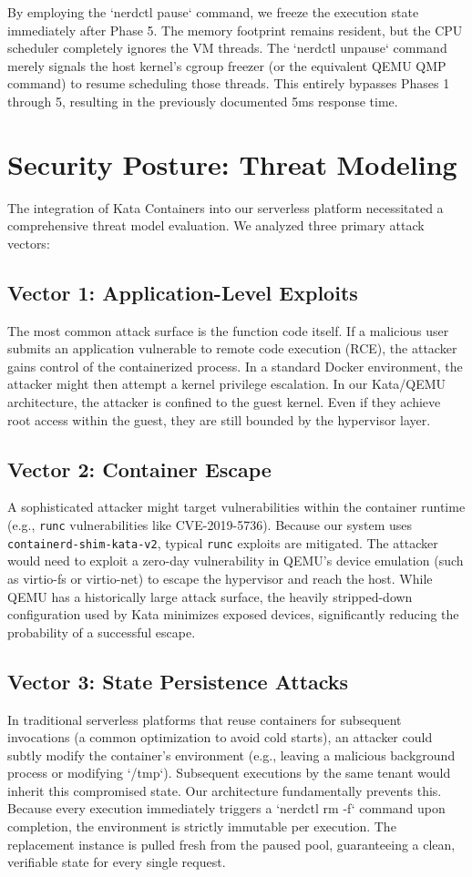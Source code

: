 \documentclass[12pt,a4paper]{report}
\begin{document}
By employing the `nerdctl pause` command, we freeze the execution state immediately after Phase 5. The memory footprint remains resident, but the CPU scheduler completely ignores the VM threads. The `nerdctl unpause` command merely signals the host kernel's cgroup freezer (or the equivalent QEMU QMP command) to resume scheduling those threads. This entirely bypasses Phases 1 through 5, resulting in the previously documented 5ms response time.

\section{Security Posture: Threat Modeling}
The integration of Kata Containers into our serverless platform necessitated a comprehensive threat model evaluation. We analyzed three primary attack vectors:

\subsection{Vector 1: Application-Level Exploits}
The most common attack surface is the function code itself. If a malicious user submits an application vulnerable to remote code execution (RCE), the attacker gains control of the containerized process. In a standard Docker environment, the attacker might then attempt a kernel privilege escalation. In our Kata/QEMU architecture, the attacker is confined to the guest kernel. Even if they achieve root access within the guest, they are still bounded by the hypervisor layer.

\subsection{Vector 2: Container Escape}
A sophisticated attacker might target vulnerabilities within the container runtime (e.g., \texttt{runc} vulnerabilities like CVE-2019-5736). Because our system uses \texttt{containerd-shim-kata-v2}, typical \texttt{runc} exploits are mitigated. The attacker would need to exploit a zero-day vulnerability in QEMU's device emulation (such as virtio-fs or virtio-net) to escape the hypervisor and reach the host. While QEMU has a historically large attack surface, the heavily stripped-down configuration used by Kata minimizes exposed devices, significantly reducing the probability of a successful escape.

\subsection{Vector 3: State Persistence Attacks}
In traditional serverless platforms that reuse containers for subsequent invocations (a common optimization to avoid cold starts), an attacker could subtly modify the container's environment (e.g., leaving a malicious background process or modifying `/tmp`). Subsequent executions by the same tenant would inherit this compromised state.
Our architecture fundamentally prevents this. Because every execution immediately triggers a `nerdctl rm -f` command upon completion, the environment is strictly immutable per execution. The replacement instance is pulled fresh from the paused pool, guaranteeing a clean, verifiable state for every single request.
\end{document}
